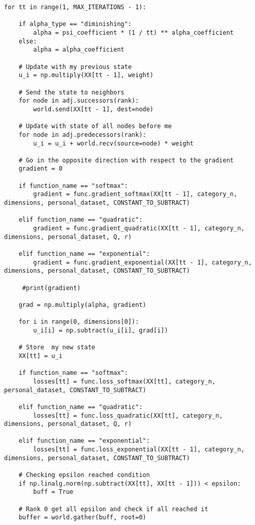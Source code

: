 \documentclass[a4paper,11pt,oneside]{book}
\begin{document}
\begin{lstlisting}
for tt in range(1, MAX_ITERATIONS - 1):

    if alpha_type == "diminishing":
        alpha = psi_coefficient * (1 / tt) ** alpha_coefficient
    else:
        alpha = alpha_coefficient

    # Update with my previous state
    u_i = np.multiply(XX[tt - 1], weight)

    # Send the state to neighbors
    for node in adj.successors(rank):
        world.send(XX[tt - 1], dest=node)

    # Update with state of all nodes before me
    for node in adj.predecessors(rank):
        u_i = u_i + world.recv(source=node) * weight

    # Go in the opposite direction with respect to the gradient
    gradient = 0

    if function_name == "softmax":
        gradient = func.gradient_softmax(XX[tt - 1], category_n, dimensions, personal_dataset, CONSTANT_TO_SUBTRACT)

    elif function_name == "quadratic":
        gradient = func.gradient_quadratic(XX[tt - 1], category_n, dimensions, personal_dataset, Q, r)

    elif function_name == "exponential":
        gradient = func.gradient_exponential(XX[tt - 1], category_n, dimensions, personal_dataset, CONSTANT_TO_SUBTRACT)

     #print(gradient)

    grad = np.multiply(alpha, gradient)

    for i in range(0, dimensions[0]):
        u_i[i] = np.subtract(u_i[i], grad[i])

    # Store  my new state
    XX[tt] = u_i

    if function_name == "softmax":
        losses[tt] = func.loss_softmax(XX[tt], category_n, personal_dataset, CONSTANT_TO_SUBTRACT)

    elif function_name == "quadratic":
        losses[tt] = func.loss_quadratic(XX[tt], category_n, dimensions, personal_dataset, Q, r)

    elif function_name == "exponential":
        losses[tt] = func.loss_exponential(XX[tt - 1], category_n, dimensions, personal_dataset, CONSTANT_TO_SUBTRACT)

    # Checking epsilon reached condition
    if np.linalg.norm(np.subtract(XX[tt], XX[tt - 1])) < epsilon:
        buff = True

    # Rank 0 get all epsilon and check if all reached it
    buffer = world.gather(buff, root=0)


\end{lstlisting}
\end{document}
